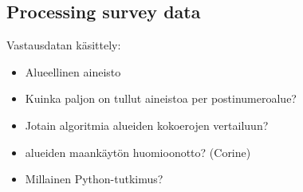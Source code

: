 \subsection{Processing survey data}
\justify
Vastausdatan käsittely:
\begin{itemize}
  \item Alueellinen aineisto
  \item Kuinka paljon on tullut aineistoa per postinumeroalue?
  \item Jotain algoritmia alueiden kokoerojen vertailuun?
  \item alueiden maankäytön huomioonotto? (Corine)
  \item Millainen Python-tutkimus?
\end{itemize}